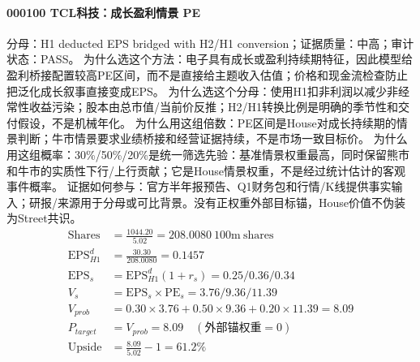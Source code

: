 \paragraph{000100 TCL科技：成长盈利情景 PE}
分母：H1 deducted EPS bridged with H2/H1 conversion；证据质量：中高；审计状态：PASS。
为什么选这个方法：电子具有成长或盈利持续期特征，因此模型给盈利桥接配置较高PE区间，而不是直接给主题收入估值；价格和现金流检查防止把泛化成长叙事直接变成EPS。
为什么选这个分母：使用H1扣非利润以减少非经常性收益污染；股本由总市值/当前价反推；H2/H1转换比例是明确的季节性和交付假设，不是机械年化。
为什么用这组倍数：PE区间是House对成长持续期的情景判断；牛市情景要求业绩桥接和经营证据持续，不是市场一致目标价。
为什么用这组概率：30\%/50\%/20\%是统一筛选先验：基准情景权重最高，同时保留熊市和牛市的实质性下行/上行贡献；它是House情景权重，不是经过统计估计的客观事件概率。
证据如何参与：官方半年报预告、Q1财务包和行情/K线提供事实输入；研报/来源用于分母或可比背景。没有正权重外部目标锚，House价值不伪装为Street共识。
\begin{align*}
\mathrm{Shares} &= \frac{1044.20}{5.02}=208.0080\ \mathrm{100m\ shares}\\
\mathrm{EPS}_{H1}^d &= \frac{30.30}{208.0080}=0.1457\\
\mathrm{EPS}_s &= \mathrm{EPS}_{H1}^d(1+r_s)=0.25/0.36/0.34\\
V_s &= \mathrm{EPS}_s\times \mathrm{PE}_s=3.76/9.36/11.39\\
V_{prob} &= 0.30\times 3.76+0.50\times 9.36+0.20\times 11.39=8.09\\
P_{target} &= V_{prob}=8.09\quad(\text{外部锚权重}=0)\\
\mathrm{Upside} &= \frac{8.09}{5.02}-1=61.2\%\\
\end{align*}

